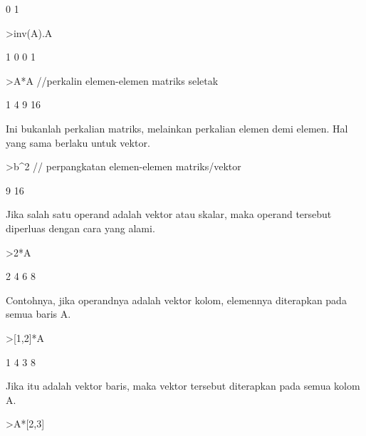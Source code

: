 \documentclass[a4paper,10pt]{article}
\begin{document}
\begin{eulernotebook}
\begin{eulercomment}
\begin{eulercomment}
\begin{euleroutput}
              0             1 
\end{euleroutput}
\begin{eulerprompt}
>inv(A).A
\end{eulerprompt}
\begin{euleroutput}
              1             0 
              0             1 
\end{euleroutput}
\begin{eulerprompt}
>A*A //perkalin elemen-elemen matriks seletak
\end{eulerprompt}
\begin{euleroutput}
              1             4 
              9            16 
\end{euleroutput}
\begin{eulercomment}
Ini bukanlah perkalian matriks, melainkan perkalian elemen demi
elemen. Hal yang sama berlaku untuk vektor.
\end{eulercomment}
\begin{eulerprompt}
>b^2 // perpangkatan elemen-elemen matriks/vektor
\end{eulerprompt}
\begin{euleroutput}
              9 
             16 
\end{euleroutput}
\begin{eulercomment}
Jika salah satu operand adalah vektor atau skalar, maka operand
tersebut diperluas dengan cara yang alami.
\end{eulercomment}
\begin{eulerprompt}
>2*A
\end{eulerprompt}
\begin{euleroutput}
              2             4 
              6             8 
\end{euleroutput}
\begin{eulercomment}
Contohnya, jika operandnya adalah vektor kolom, elemennya diterapkan
pada semua baris A.
\end{eulercomment}
\begin{eulerprompt}
>[1,2]*A
\end{eulerprompt}
\begin{euleroutput}
              1             4 
              3             8 
\end{euleroutput}
\begin{eulercomment}
Jika itu adalah vektor baris, maka vektor tersebut diterapkan pada
semua kolom A.
\end{eulercomment}
\begin{eulerprompt}
>A*[2,3]

\end{eulerprompt}
\end{eulercomment}
\end{eulercomment}
\end{eulernotebook}
\end{document}

